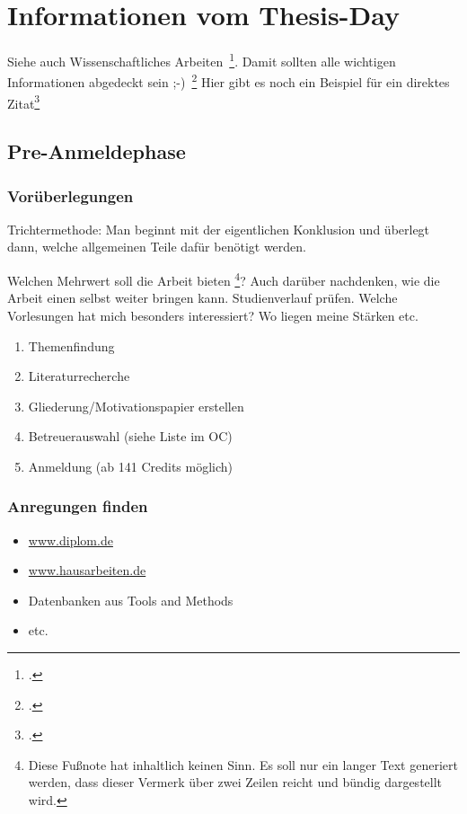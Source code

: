 \newpage
\section{Informationen vom Thesis-Day} \label{infos}
Siehe auch Wissenschaftliches Arbeiten~\footcite[\vglf][S. 1]{Balzert.2008}. %
Damit sollten alle wichtigen Informationen abgedeckt sein ;-)~\footcite[\vglf][]{Balzert.2008} %
Hier gibt es noch ein Beispiel für ein direktes Zitat\footcite[][]{Balzert.2008} %

\subsection{Pre-Anmeldephase}
\subsubsection{Vorüberlegungen}
Trichtermethode: Man beginnt mit der eigentlichen  Konklusion und überlegt dann, welche allgemeinen Teile dafür benötigt werden.

Welchen Mehrwert soll die Arbeit bieten \footnote{Diese Fu\ss note hat inhaltlich keinen Sinn. Es soll nur ein langer Text generiert werden, dass dieser Vermerk über zwei Zeilen reicht und bündig dargestellt wird.}? Auch darüber nachdenken, wie die Arbeit einen selbst weiter bringen kann. Studienverlauf prüfen. Welche Vorlesungen hat mich besonders interessiert? Wo liegen meine Stärken etc.

\begin{enumerate}
\item Themenfindung
\item Literaturrecherche
\item Gliederung/Motivationspapier erstellen
\item Betreuerauswahl (siehe Liste im \ac{OC})
\item Anmeldung (ab 141 Credits möglich)
\end{enumerate}

\subsubsection{Anregungen finden}
\begin{itemize}
\item \href{http://www.diplom.de}{www.diplom.de}
\item \href{http://www.hausarbeiten.de}{www.hausarbeiten.de}
\item Datenbanken aus Tools and Methods
\item etc.
\end{itemize}

